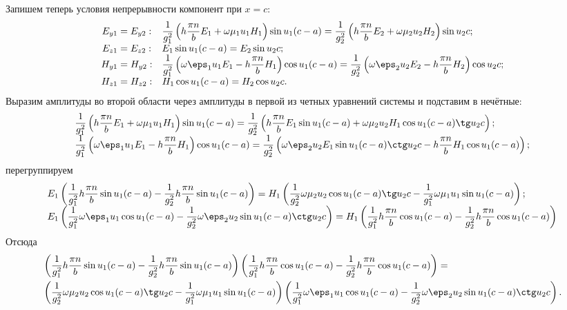 \documentclass[a4paper]{hedsemwork}
\renewcommand{\frac}{\dfrac}
\begin{document}
Запишем теперь условия непрерывности компонент при \( x = c \):
\[
\begin{array}{cl}
    E_{y1} = E_{y2}: &
    \frac{1}{g_1^2} \left(h \frac{\pi n}{b} E_1 + \omega\mu_1u_1H_1\right)
    \sin u_1 (c-a) =  \frac{1}{g_2^2}
    \left(h \frac{\pi n}{b} E_2 + \omega\mu_2u_2H_2\right)
    \sin u_2 c ;\\
    E_{z1} = E_{z2}: & E_1\sin u_1 (c-a) = E_2\sin u_2 c; \\
    H_{y1} = H_{y2}: &
    \frac{1}{g_1^2}\left(\omega\eps_1u_1E_1-h \frac{\pi n}{b} H_1\right)
    \cos u_1 (c-a) = \frac{1}{g_2^2}
    \left(\omega\eps_2u_2E_2-h \frac{\pi n}{b} H_2\right)\cos u_2 c ;\\
    H_{z1} = H_{z2}: & H_1\cos u_1 (c-a) = H_2\cos u_2 c.\\
\end{array}
\]
Выразим амплитуды во второй области через амплитуды в первой из четных уравнений
системы и подставим в нечётные:
\[
\begin{array}{l}
    \frac{1}{g_1^2} \left(h \frac{\pi n}{b} E_1 + \omega\mu_1u_1H_1\right)
    \sin u_1 (c-a) =  \frac{1}{g_2^2}
    \left(h \frac{\pi n}{b} E_1 \sin u_1(c-a) +
    \omega\mu_2u_2H_1\cos u_1 (c-a) \tg u_2 c \right) ;\\
    \frac{1}{g_1^2}\left(\omega\eps_1u_1E_1-h \frac{\pi n}{b} H_1\right)
    \cos u_1 (c-a) = \frac{1}{g_2^2}
    \left(\omega\eps_2u_2E_1\sin u_1(c-a)\ctg u_2 c-
    h \frac{\pi n}{b} H_1\cos u_1 (c-a)\right) ;\\
\end{array}
\]
перегруппируем
\[
\begin{array}{l}
    E_1\left(\frac{1}{g_1^2} h \frac{\pi n}{b}\sin u_1 (c-a) -
    \frac{1}{g_2^2}h \frac{\pi n}{b}\sin u_1(c-a)\right) =
    H_1\left(\frac{1}{g_2^2}\omega\mu_2u_2\cos u_1 (c-a) \tg u_2 c-
    \frac{1}{g_1^2}\omega\mu_1u_1\sin u_1 (c-a)\right);\\
    E_1\left(\frac{1}{g_1^2}\omega\eps_1u_1\cos u_1 (c-a)-
    \frac{1}{g_2^2}\omega\eps_2u_2\sin u_1(c-a)\ctg u_2 c\right)=
    H_1\left(\frac{1}{g_1^2}h \frac{\pi n}{b} \cos u_1 (c-a)-
    \frac{1}{g_2^2}h \frac{\pi n}{b} \cos u_1 (c-a)\right)
\end{array}
\]
Отсюда
\begin{align*}
    &\left(\frac{1}{g_1^2} h \frac{\pi n}{b}\sin u_1 (c-a) -
    \frac{1}{g_2^2}h \frac{\pi n}{b}\sin u_1(c-a)\right)\left(\frac{1}{g_1^2}h \frac{\pi n}{b} \cos u_1 (c-a)-
    \frac{1}{g_2^2}h \frac{\pi n}{b} \cos u_1 (c-a)\right) =\\
    & \left(\frac{1}{g_2^2}\omega\mu_2u_2\cos u_1 (c-a) \tg u_2 c-
    \frac{1}{g_1^2}\omega\mu_1u_1\sin u_1 (c-a)\right)
    \left(\frac{1}{g_1^2}\omega\eps_1u_1\cos u_1 (c-a)-
    \frac{1}{g_2^2}\omega\eps_2u_2\sin u_1(c-a)\ctg u_2 c\right).
\end{align*}
\end{document}
